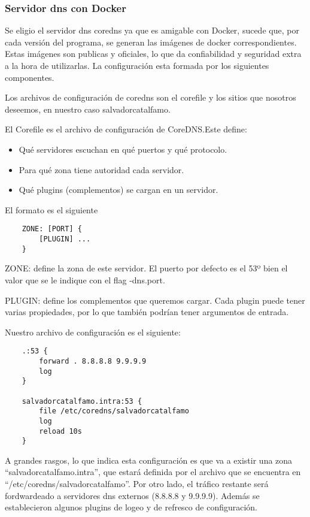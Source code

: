\subsubsection*{Servidor dns con Docker}

Se eligio el servidor dns coredns ya que es amigable con Docker, sucede que, por cada versión del 
programa, se generan las imágenes de docker correspondientes. Estas imágenes son publicas y oficiales, 
lo que da confiabilidad y seguridad extra a la hora de utilizarlas. La configuración esta formada por 
los siguientes componentes.

Los archivos de configuración de coredns son el corefile y los sitios que nosotros deseemos, en nuestro 
caso salvadorcatalfamo.

El Corefile es el archivo de configuración de CoreDNS.Este define:
\begin{itemize}
    \item Qué servidores escuchan en qué puertos y qué protocolo.
    \item Para qué zona tiene autoridad cada servidor.
    \item Qué plugins (complementos) se cargan en un servidor.
\end{itemize}

\noindent El formato es el siguiente
\begin{verbatim}
    ZONE: [PORT] {
        [PLUGIN] ...
    }
\end{verbatim}

\noindent ZONE: define la zona de este servidor. El puerto por defecto es el 53º bien el valor que se le indique 
con el flag -dns.port.

\noindent PLUGIN: define los complementos que queremos cargar. Cada plugin puede tener varias propiedades, por 
lo que también podrían tener argumentos de entrada.

\noindent Nuestro archivo de configuración es el siguiente:
\begin{verbatim}
    .:53 {
        forward . 8.8.8.8 9.9.9.9
        log
    }

    salvadorcatalfamo.intra:53 {
        file /etc/coredns/salvadorcatalfamo
        log
        reload 10s
    }    
\end{verbatim}

A grandes rasgos, lo que indica esta configuración es que va a existir una zona 
“salvadorcatalfamo.intra”, que estará definida por el archivo que se encuentra en 
“/etc/coredns/salvadorcatalfamo”. Por otro lado, el tráfico restante será fordwardeado a 
servidores dns externos (8.8.8.8 y 9.9.9.9). Además se establecieron algunos plugins de logeo y 
de refresco de configuración.

